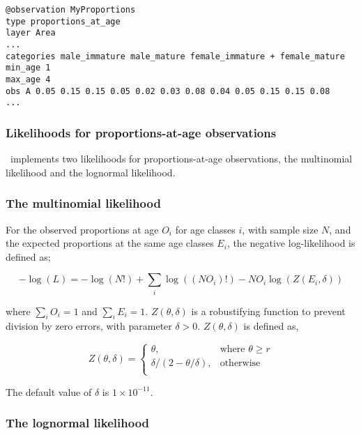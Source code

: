 {{{{{{{\small{\begin{verbatim}
@observation MyProportions
type proportions_at_age
layer Area
...
categories male_immature male_mature female_immature + female_mature
min_age 1
max_age 4
obs A 0.05 0.15 0.15 0.05 0.02 0.03 0.08 0.04 0.05 0.15 0.15 0.08
...
\end{verbatim}}}

\subsubsection{Likelihoods for proportions-at-age observations}

\iSAM\ implements two likelihoods for proportions-at-age observations, the multinomial likelihood and the lognormal likelihood. 

\subsubsection*{The multinomial likelihood}

For the observed proportions at age $O_i$ for age classes $i$, with sample size $N$, and the expected proportions at the same age classes $E_i$, the negative log-likelihood is defined as; 

\begin{equation}
  -\log \left(L \right) =  -\log \left(N! \right) + \sum\limits_i \log \left( \left(NO_i \right)! \right) - NO_i \log \left(Z \left(E_i,\delta \right) \right)
\end{equation}

where $\sum\limits_i O_i = 1$ and $\sum\limits_i E_i = 1$. $Z \left(\theta,\delta \right)$ is a robustifying function to prevent division by zero errors, with parameter $\delta>0$. $Z \left(\theta,\delta \right)$ is defined as,

\begin{equation}
   Z \left(\theta,\delta \right) = \begin{cases}
	  \theta, & \text{where $\theta \ge r$} \\
	  \delta/\left( 2-\theta/\delta \right), & \text{otherwise} \\  
  \end{cases}
\end{equation}

The default value of $\delta$ is $1 \times 10^{-11}$.

\subsubsection*{The lognormal likelihood}

}}}}}}

